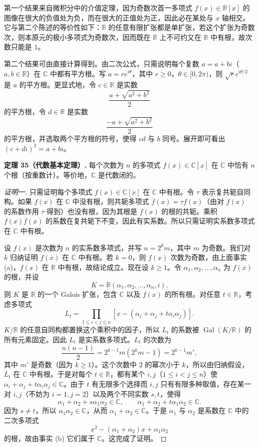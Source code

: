 第一个结果来自微积分中的介值定理，因为奇数次首一多项式 $f(x)\in\mathbb R[x]$ 的图像在很大的负值处为负，而在很大的正值处为正，因此必在某处与 $x$ 轴相交。它与第二个陈述的等价性如下：$\mathbb R$ 的任意有限扩张都是单扩张，若这个扩张为奇数次，则本原元的极小多项式为奇数次，因而既在 $\mathbb R$ 上不可约又在 $\mathbb R$ 中有根，故次数只能是 $1$。

第二个结果可由直接计算得到。由二次公式，只需说明每个复数 $a=a+bi$（$a,b\in\mathbb R$）在 $\mathbb C$ 中都有平方根。写 $a=re^{i\theta}$，其中 $r\geq0$，$\theta\in[0,2\pi)$，则 $\sqrt r e^{i\theta/2}$ 是 $a$ 的平方根。更显式地，令 $c\in\mathbb R$ 是实数
\[
\frac{a+\sqrt{a^2+b^2}}{2}
\]
的平方根，令 $d\in\mathbb R$ 是实数
\[
\frac{-a+\sqrt{a^2+b^2}}{2}
\]
的平方根，并选取两个平方根的符号，使得 $cd$ 与 $b$ 同号。展开即可看出 $(c+di)^2=a+bi$。

\noindent\textbf{定理 35（代数基本定理）.} 每个次数为 $n$ 的多项式 $f(x)\in\mathbb C[x]$ 在 $\mathbb C$ 中恰有 $n$ 个根（按重数计）。等价地，$\mathbb C$ 是代数闭的。

\begin{proof}[证明一]
只需证明每个多项式 $f(x)\in\mathbb C[x]$ 在 $\mathbb C$ 中有根。令 $\tau$ 表示复共轭自同构。如果 $f(x)$ 在 $\mathbb C$ 中没有根，则共轭多项式 $\overline f(x)=\tau f(x)$（由对 $f(x)$ 的系数作用 $\tau$ 得到）也没有根，因为其根是 $f(x)$ 的根的共轭。乘积 $f(x)\overline f(x)$ 的系数在复共轭下不变，因此有实系数。所以只需证明实系数多项式在 $\mathbb C$ 中有根。

设 $f(x)$ 是次数为 $n$ 的实系数多项式，并写 $n=2^km$，其中 $m$ 为奇数。我们对 $k$ 归纳证明 $f(x)$ 在 $\mathbb C$ 中有根。若 $k=0$，则 $f(x)$ 次数为奇数，由上面事实 (a)，$f(x)$ 在 $\mathbb R$ 中有根，故结论成立。现在设 $k\geq1$。令 $\alpha_1,\alpha_2,\ldots,\alpha_n$ 为 $f(x)$ 的根，并设
\[
K=\mathbb R(\alpha_1,\alpha_2,\ldots,\alpha_n,i).
\]
则 $K$ 是 $\mathbb R$ 的一个 Galois 扩张，包含 $\mathbb C$ 以及 $f(x)$ 的所有根。对任意 $t\in\mathbb R$，考虑多项式
\[
L_t=\prod_{1\leq i<j\leq n}\left[x-(\alpha_i+\alpha_j+t\alpha_i\alpha_j)\right].
\]
$K/\mathbb R$ 的任意自同构都置换这个乘积中的因子，所以 $L_t$ 的系数被 $\operatorname{Gal}(K/\mathbb R)$ 的所有元素固定。因此 $L_t$ 是实系数多项式。$L_t$ 的次数为
\[
\frac{n(n-1)}{2}=2^{k-1}m(2^km-1)=2^{k-1}m',
\]
其中 $m'$ 是奇数（因为 $k\geq1$）。这个次数中 $2$ 的幂次小于 $k$，所以由归纳假设，$L_t$ 在 $\mathbb C$ 中有根。于是对每个 $t\in\mathbb R$，都有某个 $i,j$（$1\leq i<j\leq n$）使 $\alpha_i+\alpha_j+t\alpha_i\alpha_j\in\mathbb C$。由于 $t$ 有无限多个选择而 $i,j$ 只有有限多种取值，存在某一对 $i,j$（不妨为 $i=1,j=2$）以及两个不同实数 $s,t$，使得
\[
\alpha_1+\alpha_2+s\alpha_1\alpha_2\in\mathbb C,
\qquad
\alpha_1+\alpha_2+t\alpha_1\alpha_2\in\mathbb C.
\]
因为 $s\neq t$，所以 $\alpha_1\alpha_2\in\mathbb C$，从而 $\alpha_1+\alpha_2\in\mathbb C$。于是 $\alpha_1$ 与 $\alpha_2$ 是系数在 $\mathbb C$ 中的二次多项式
\[
x^2-(\alpha_1+\alpha_2)x+\alpha_1\alpha_2
\]
的根，故由事实 (b) 它们属于 $\mathbb C$。这完成了证明。
\end{proof}

